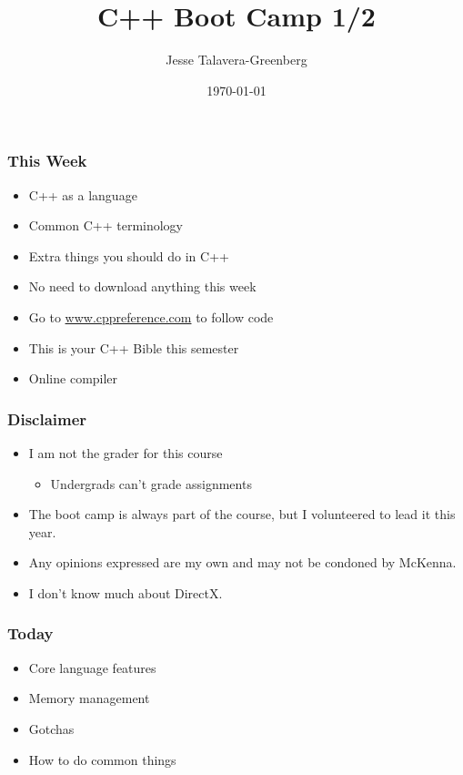\documentclass[glossy]{beamer}
\title{C++ Boot Camp 1/2}
\author{Jesse Talavera-Greenberg}
\date{\today}
\begin{document}
\newcommand{\cppref}[2]{\href{http://en.cppreference.com/w/cpp/#1}{\underline{#2}}}

\begin{frame}
\maketitle
\end{frame}

\begin{frame}
\frametitle{This Week}
  \begin{itemize}
    \item C++ as a language
    \item Common C++ terminology
    \item Extra things you should do in C++
    \item No need to download anything this week
    \item Go to \href{www.cppreference.com}{www.cppreference.com} to follow code
    \item This is your C++ Bible this semester
    \item Online compiler
  \end{itemize}
\end{frame}

\begin{frame}
\frametitle{Disclaimer}
    \begin{itemize}
        \item I am not the grader for this course
        \begin{itemize}
            \item Undergrads can't grade assignments
        \end{itemize}
        \item The boot camp is always part of the course, but I volunteered to lead it this year.
        \item Any opinions expressed are my own and may not be condoned by McKenna.
        \item I don't know much about DirectX.
    \end{itemize}
\end{frame}

\begin{frame}
  \frametitle{Today}
  \begin{itemize}
    \item Core language features
    \item Memory management
    \item Gotchas
    \item How to do common things
  \end{itemize}
\end{frame}
\end{document}
